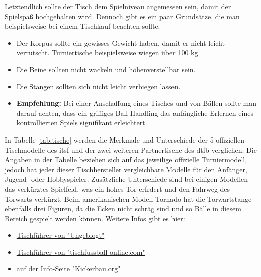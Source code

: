 Letztendlich sollte der Tisch dem Spielniveau angemessen sein, damit der Spielspaß hochgehalten wird. Dennoch gibt es ein paar Grundsätze, die man beispielsweise bei einem Tischkauf beachten sollte:
\begin{itemize}
    \item Der Korpus sollte ein gewisses Gewicht haben, damit er nicht leicht verrutscht. Turniertische beispielsweise wiegen über 100 kg.
    \item Die Beine sollten nicht wackeln und höhenverstellbar sein.
    \item Die Stangen sollten sich nicht leicht verbiegen lassen.
    \item {\normalfont \bfseries Empfehlung:} Bei einer Anschaffung eines Tisches und von Bällen sollte man darauf achten, dass ein griffiges Ball-Handling das anfängliche Erlernen eines kontrollierten Spiels signifikant erleichtert.
\end{itemize}

In Tabelle \ref{tab:tische} werden die Merkmale und Unterschiede der 5 offiziellen Tischmodelle des \gls{itsf} und der zwei weiteren Partnertische des \gls{dtfb} verglichen. 
Die Angaben in der Tabelle beziehen sich auf das jeweilige offizielle Turniermodell, jedoch hat jeder dieser Tischhersteller vergleichbare Modelle für den Anfänger, Jugend- oder Hobbyspieler. 
Zusätzliche Unterschiede sind bei einigen Modellen das verkürztes Spielfeld, was ein hohes Tor erfrdert und den Fahrweg des Torwarts verkürzt.
Beim amerikanischen Modell Tornado hat die Torwartstange ebenfalls drei Figuren, da die Ecken nicht schräg sind und so Bälle in diesem Bereich gespielt werden können.
Weitere Infos gibt es hier:
\begin{itemize}
    \item \href{http://ungeblogtkickern.blogspot.de/2015/06/inhaltsverzeichnis.html}{Tischführer von "Ungeblogt"}
    \item \href{http://tischfussball-online.com/kaufberatung.html}{Tischführer von "tischfussball-online.com"}
    \item \href{http://www.kickerbau.org/}{auf der Info-Seite "Kickerbau.org"}
\end{itemize}


